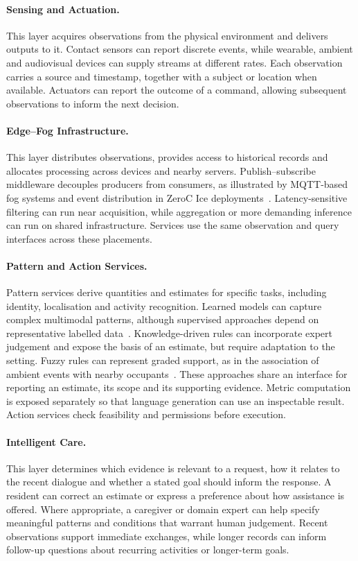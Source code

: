 \documentclass[a4paper,twoside]{article}
\begin{document}
\paragraph{Sensing and Actuation.}
This layer acquires observations from the physical environment and delivers outputs to it. Contact sensors can report discrete events, while wearable, ambient and audiovisual devices can supply streams at different rates. Each observation carries a source and timestamp, together with a subject or location when available. Actuators can report the outcome of a command, allowing subsequent observations to inform the next decision.

\paragraph{Edge--Fog Infrastructure.}
This layer distributes observations, provides access to historical records and allocates processing across devices and nearby servers. Publish--subscribe middleware decouples producers from consumers, as illustrated by MQTT-based fog systems and event distribution in ZeroC Ice deployments~\cite{oasis2019mqtt,zerocIcestorm}. Latency-sensitive filtering can run near acquisition, while aggregation or more demanding inference can run on shared infrastructure. Services use the same observation and query interfaces across these placements.

\paragraph{Pattern and Action Services.}
Pattern services derive quantities and estimates for specific tasks, including identity, localisation and activity recognition. Learned models can capture complex multimodal patterns, although supervised approaches depend on representative labelled data~\cite{ordonez2016deep}. Knowledge-driven rules can incorporate expert judgement and expose the basis of an estimate, but require adaptation to the setting. Fuzzy rules can represent graded support, as in the association of ambient events with nearby occupants~\cite{poloMultiOccupancy}. These approaches share an interface for reporting an estimate, its scope and its supporting evidence. Metric computation is exposed separately so that language generation can use an inspectable result. Action services check feasibility and permissions before execution.

\paragraph{Intelligent Care.}
This layer determines which evidence is relevant to a request, how it relates to the recent dialogue and whether a stated goal should inform the response. A resident can correct an estimate or express a preference about how assistance is offered. Where appropriate, a caregiver or domain expert can help specify meaningful patterns and conditions that warrant human judgement. Recent observations support immediate exchanges, while longer records can inform follow-up questions about recurring activities or longer-term goals.
\end{document}
